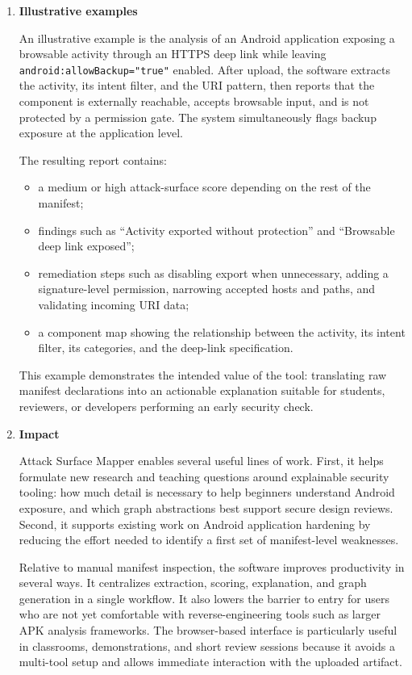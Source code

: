 \documentclass[preprint,12pt,a4paper]{elsarticle}
\begin{document}
\begin{enumerate}
\item \textbf{Illustrative examples}

An illustrative example is the analysis of an Android application exposing a browsable activity through an HTTPS deep link while leaving \texttt{android:allowBackup="true"} enabled. After upload, the software extracts the activity, its intent filter, and the URI pattern, then reports that the component is externally reachable, accepts browsable input, and is not protected by a permission gate. The system simultaneously flags backup exposure at the application level.

The resulting report contains:

\begin{itemize}
    \item a medium or high attack-surface score depending on the rest of the manifest;
    \item findings such as ``Activity exported without protection'' and ``Browsable deep link exposed'';
    \item remediation steps such as disabling export when unnecessary, adding a signature-level permission, narrowing accepted hosts and paths, and validating incoming URI data;
    \item a component map showing the relationship between the activity, its intent filter, its categories, and the deep-link specification.
\end{itemize}

This example demonstrates the intended value of the tool: translating raw manifest declarations into an actionable explanation suitable for students, reviewers, or developers performing an early security check.

\item \textbf{Impact}

Attack Surface Mapper enables several useful lines of work. First, it helps formulate new research and teaching questions around explainable security tooling: how much detail is necessary to help beginners understand Android exposure, and which graph abstractions best support secure design reviews. Second, it supports existing work on Android application hardening by reducing the effort needed to identify a first set of manifest-level weaknesses.

Relative to manual manifest inspection, the software improves productivity in several ways. It centralizes extraction, scoring, explanation, and graph generation in a single workflow. It also lowers the barrier to entry for users who are not yet comfortable with reverse-engineering tools such as larger APK analysis frameworks. The browser-based interface is particularly useful in classrooms, demonstrations, and short review sessions because it avoids a multi-tool setup and allows immediate interaction with the uploaded artifact.


\end{enumerate}
\end{document}
